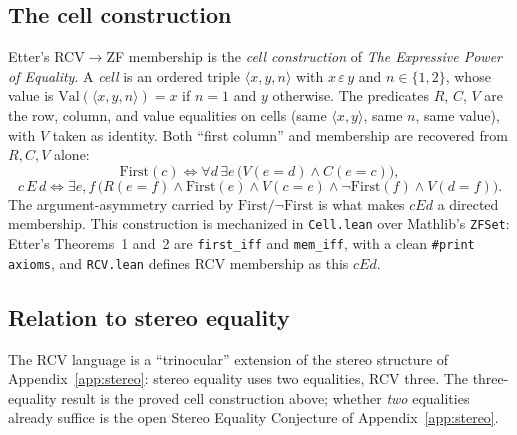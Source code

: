 \documentclass[11pt, a4paper]{article}
\theoremstyle{remark}
\begin{document}
\begin{appendices}
\subsection{The cell construction}

Etter's RCV$\to$ZF membership is the \emph{cell construction} of \emph{The Expressive Power of Equality}\cite{etter_power}. A \emph{cell} is an ordered triple $\langle x, y, n\rangle$ with $x \,\varepsilon\, y$ and $n \in \{1, 2\}$, whose value is $\mathrm{Val}(\langle x, y, n\rangle) = x$ if $n = 1$ and $y$ otherwise. The predicates $R$, $C$, $V$ are the row, column, and value equalities on cells (same $\langle x, y\rangle$, same $n$, same value), with $V$ taken as identity. Both ``first column'' and membership are recovered from $R, C, V$ alone:
\[ \mathrm{First}(c) \iff \forall d\,\exists e\,\bigl(V(e{=}d) \land C(e{=}c)\bigr), \]
\[ c\,E\,d \iff \exists e, f\,\bigl(R(e{=}f) \land \mathrm{First}(e) \land V(c{=}e) \land \neg\mathrm{First}(f) \land V(d{=}f)\bigr). \]
The argument-asymmetry carried by $\mathrm{First}/\neg\mathrm{First}$ is what makes $cEd$ a directed membership. This construction is mechanized in \texttt{Cell.lean} over Mathlib's \texttt{ZFSet}: Etter's Theorems~1 and~2 are \texttt{first\_iff} and \texttt{mem\_iff}, with a clean \texttt{\#print axioms}, and \texttt{RCV.lean} defines RCV membership as this $cEd$.

\subsection{Relation to stereo equality}

The RCV language is a ``trinocular'' extension of the stereo structure of Appendix~\ref{app:stereo}: stereo equality uses two equalities, RCV three. The three-equality result is the proved cell construction above; whether \emph{two} equalities already suffice is the open Stereo Equality Conjecture of Appendix~\ref{app:stereo}.

\end{appendices}
\end{document}

